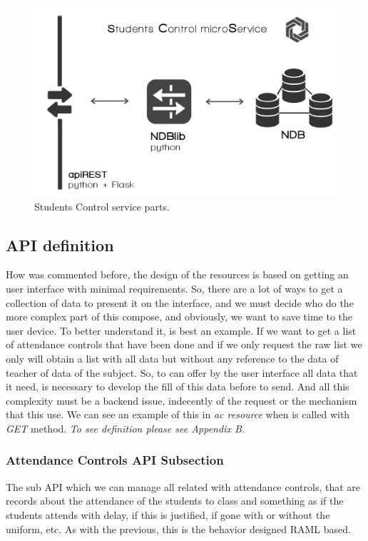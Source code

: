 \begin{figure}[H]
  \includegraphics[scale=0.4]{img/graphics/scms.png}
  \centering
  \caption{Students Control service parts.}
\end{figure}

\subsection{API definition}

How was commented before, the design of the resources is based on getting an user
interface with minimal requirements. So, there are a lot of ways to get a collection
of data to present it on the interface, and we must decide who do the more complex
part of this compose, and obviously, we want to save time to the user device.
To better understand it, is best an example. If we want to get a list of attendance
controls that have been done and if we only request the raw list we only will
obtain a list with all data but without any reference to the data of teacher of
data of the subject.
\intro
So, to can offer by the user interface all data that it need,   is necessary to
develop the fill of this data before to send. And all this complexity must be a
backend issue, indecently of the request or the mechanism that this use.
We can see an example of this in \textit{ac resource} when is called with
\textit{GET} method.\intro
\textit{To see definition please see Appendix B.}
\intro

\subsubsection{Attendance Controls API Subsection}
The sub API which we can manage all related with attendance controls, that are
records about the attendance of the students to class and something as if the
students attends with delay, if this is justified, if gone with or without
the uniform, etc. As with the previous, this is the behavior designed RAML based.


